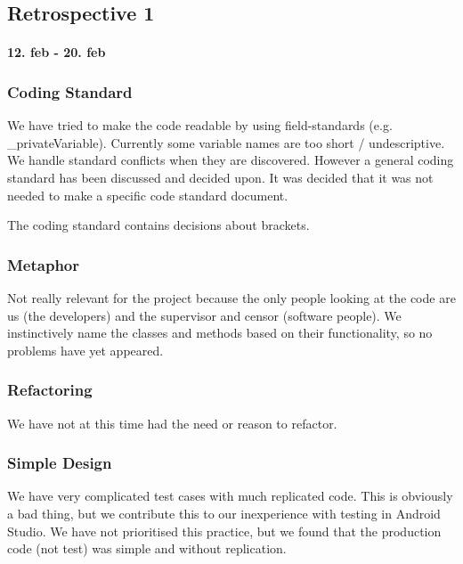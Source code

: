 \subsection*{Retrospective 1}
\paragraph{12. feb - 20. feb}

\subsubsection{Coding Standard}
We have tried to make the code readable by using field-standards  (e.g. _privateVariable). Currently some variable names are too short / undescriptive.
We handle standard conflicts when they are discovered.
However a general coding standard has been discussed and decided upon. It was decided that it was not needed to make a specific code standard document.

The coding standard contains decisions about brackets.

\subsubsection{Metaphor}
Not really relevant for the project because the only people looking at the code are us (the developers) and the supervisor and censor (software people).
We instinctively name the classes and methods based on their functionality, so no problems have yet appeared.

\subsubsection{Refactoring}
We have not at this time had the need or reason to refactor.

\subsubsection{Simple Design}
We have very complicated test cases with much replicated code. This is obviously a bad thing, but we contribute this to our inexperience with testing in Android Studio.
We have not prioritised this practice, but we found that the production code (not test) was simple and without replication.

